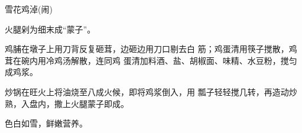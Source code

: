\begin{recipe}{雪花鸡淖(闹)}

\ingredients



\cooking

\step 	火腿剁为细末成“蒙子”。

\step 	鸡脯在墩子上用刀背反复砸茸，边砸边用刀口剔去白 筋；鸡蛋清用筷子搅散，鸡茸在碗内用冷鸡汤解散，连同鸡 蛋清加料酒、盐、胡椒面、味精、水豆粉，搅匀成鸡浆。

\step 	炒锅在旺火上将油烧至八成火候，即将鸡浆倒入，用 瓢子轻轻搅几转，再造动炒熟，入盘内，撒上火腿蒙子即成。

\notes

色白如雪，鲜嫩营养。

\end{recipe}

